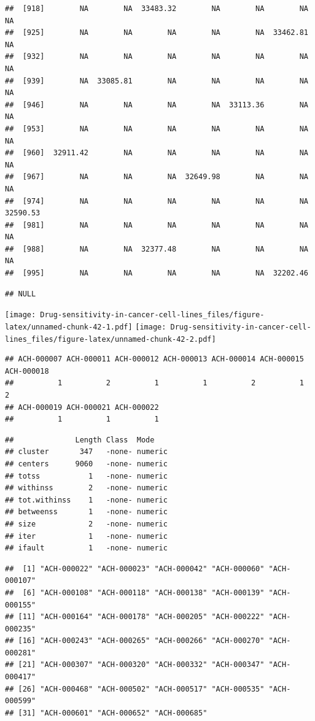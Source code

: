 \documentclass[
]{article}
\begin{document}
\begin{verbatim}
##  [918]        NA        NA  33483.32        NA        NA        NA        NA
##  [925]        NA        NA        NA        NA        NA  33462.81        NA
##  [932]        NA        NA        NA        NA        NA        NA        NA
##  [939]        NA  33085.81        NA        NA        NA        NA        NA
##  [946]        NA        NA        NA        NA  33113.36        NA        NA
##  [953]        NA        NA        NA        NA        NA        NA        NA
##  [960]  32911.42        NA        NA        NA        NA        NA        NA
##  [967]        NA        NA        NA  32649.98        NA        NA        NA
##  [974]        NA        NA        NA        NA        NA        NA  32590.53
##  [981]        NA        NA        NA        NA        NA        NA        NA
##  [988]        NA        NA  32377.48        NA        NA        NA        NA
##  [995]        NA        NA        NA        NA        NA  32202.46
\end{verbatim}

\begin{verbatim}
## NULL
\end{verbatim}

\texttt{[image: Drug-sensitivity-in-cancer-cell-lines\_files/figure-latex/unnamed-chunk-42-1.pdf]}
\texttt{[image: Drug-sensitivity-in-cancer-cell-lines\_files/figure-latex/unnamed-chunk-42-2.pdf]}

\begin{verbatim}
## ACH-000007 ACH-000011 ACH-000012 ACH-000013 ACH-000014 ACH-000015 ACH-000018 
##          1          2          1          1          2          1          2 
## ACH-000019 ACH-000021 ACH-000022 
##          1          1          1
\end{verbatim}

\begin{verbatim}
##              Length Class  Mode   
## cluster       347   -none- numeric
## centers      9060   -none- numeric
## totss           1   -none- numeric
## withinss        2   -none- numeric
## tot.withinss    1   -none- numeric
## betweenss       1   -none- numeric
## size            2   -none- numeric
## iter            1   -none- numeric
## ifault          1   -none- numeric
\end{verbatim}

\begin{verbatim}
##  [1] "ACH-000022" "ACH-000023" "ACH-000042" "ACH-000060" "ACH-000107"
##  [6] "ACH-000108" "ACH-000118" "ACH-000138" "ACH-000139" "ACH-000155"
## [11] "ACH-000164" "ACH-000178" "ACH-000205" "ACH-000222" "ACH-000235"
## [16] "ACH-000243" "ACH-000265" "ACH-000266" "ACH-000270" "ACH-000281"
## [21] "ACH-000307" "ACH-000320" "ACH-000332" "ACH-000347" "ACH-000417"
## [26] "ACH-000468" "ACH-000502" "ACH-000517" "ACH-000535" "ACH-000599"
## [31] "ACH-000601" "ACH-000652" "ACH-000685"
\end{verbatim}
\end{document}

